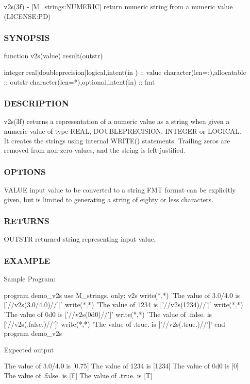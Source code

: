 v2s(3f) -\/ \mbox{[}M\+\_\+strings\+:N\+U\+M\+E\+R\+IC\mbox{]} return numeric string from a numeric value (L\+I\+C\+E\+N\+SE\+:PD) 

\subsubsection*{S\+Y\+N\+O\+P\+S\+IS}

\begin{DoxyVerb}   function v2s(value) result(outstr)

    integer|real|doubleprecision|logical,intent(in ) :: value
    character(len=:),allocatable :: outstr
    character(len=*),optional,intent(in) :: fmt
\end{DoxyVerb}


\subsubsection*{D\+E\+S\+C\+R\+I\+P\+T\+I\+ON}

v2s(3f) returns a representation of a numeric value as a string when given a numeric value of type R\+E\+AL, D\+O\+U\+B\+L\+E\+P\+R\+E\+C\+I\+S\+I\+ON, I\+N\+T\+E\+G\+ER or L\+O\+G\+I\+C\+AL. It creates the strings using internal W\+R\+I\+T\+E() statements. Trailing zeros are removed from non-\/zero values, and the string is left-\/justified.

\subsubsection*{O\+P\+T\+I\+O\+NS}

V\+A\+L\+UE input value to be converted to a string F\+MT format can be explicitly given, but is limited to generating a string of eighty or less characters.

\subsubsection*{R\+E\+T\+U\+R\+NS}

O\+U\+T\+S\+TR returned string representing input value,

\subsubsection*{E\+X\+A\+M\+P\+LE}

\begin{DoxyVerb}Sample Program:

 program demo_v2s
 use M_strings, only: v2s
 write(*,*) 'The value of 3.0/4.0 is ['//v2s(3.0/4.0)//']'
 write(*,*) 'The value of 1234    is ['//v2s(1234)//']'
 write(*,*) 'The value of 0d0     is ['//v2s(0d0)//']'
 write(*,*) 'The value of .false. is ['//v2s(.false.)//']'
 write(*,*) 'The value of .true. is  ['//v2s(.true.)//']'
 end program demo_v2s

Expected output

 The value of 3.0/4.0 is [0.75]
 The value of 1234    is [1234]
 The value of 0d0     is [0]
 The value of .false. is [F]
 The value of .true. is  [T]
\end{DoxyVerb}


